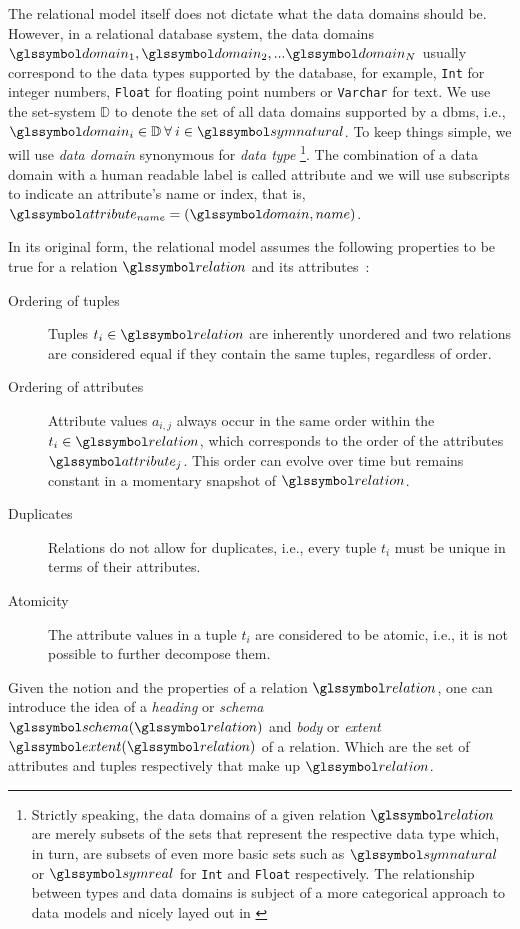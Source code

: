 The relational model itself does not dictate what the data domains should be. However, in a relational database system, the data domains $\domain_1, \domain_2, ... \domain_N$ usually correspond to the data types supported by the database, for example, \lstinline{Int} for integer numbers, \lstinline{Float} for floating point numbers or \lstinline{Varchar} for text. We use the set-system $\mathbb{D}$ to denote the set of all data domains supported by a \gls{dbms}, i.e., $\domain_i \in \mathbb{D} \: \forall \:  i \in \symnatural$. To keep things simple, we will use \emph{data domain} synonymous for \emph{data type} \footnote{Strictly speaking, the data domains of a given relation $\relation$ are merely subsets of the sets that represent the respective data type which, in turn, are subsets of even more basic sets such as $\symnatural$ or $\symreal$ for \lstinline{Int} and \lstinline{Float} respectively. The relationship between types and data domains is subject of a more categorical approach to data models and nicely layed out in \cite{Spivak:2009Simplicial}}. The combination of a data domain with a human readable label is called attribute and we will use subscripts to indicate an attribute's name or index, that is, $\attribute_{name} = (\domain, name)$. 

In its original form, the relational model assumes the following properties to be true for a relation $\relation$ and its attributes~\cite{Codd:1970Relational}:

\begin{description}
    \item[Ordering of tuples] Tuples $t_i \in \relation$ are inherently unordered and two relations are considered equal if they contain the same tuples, regardless of order.
    \item[Ordering of attributes] Attribute values $a_{i,j}$ always occur in the same order within the $t_i \in \relation$, which corresponds to the order of the attributes $\attribute_j$. This order can evolve over time but remains constant in a momentary snapshot of $\relation$.
    \item[Duplicates] Relations do not allow for duplicates, i.e., every tuple $t_i$ must be unique in terms of their attributes.
    \item[Atomicity] The attribute values in a tuple $t_i$ are considered to be atomic, i.e., it is not possible to further decompose them.
\end{description}

Given the notion and the properties of a relation $\relation$, one can introduce the idea of a \emph{heading} or \emph{schema} $\schema(\relation)$ and \emph{body} or \emph{extent} $\extent(\relation)$ of a relation. Which are the set of attributes and tuples respectively that make up $\relation$.

